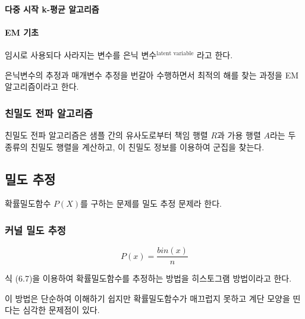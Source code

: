 \documentclass [12pt] {oblivoir}
\let\oldsubsubsection=\subsubsection
\renewcommand{\subsubsection}
{
  \filbreak
  \oldsubsubsection
}
\begin{document}
\vspace{3mm}

\paragraph*{다중 시작 k-평균 알고리즘}\mbox{}

\vspace{3mm}

\paragraph*{EM 기초}\mbox{}

임시로 사용되다 사라지는 변수를 은닉 변수$^{\text{latent variable}}$ 라고 한다.

\vspace{3mm}

은닉변수의 추정과 매개변수 추정을 번갈아 수행하면서 최적의 해를 찾는 과정을 EM 알고리즘이라고 한다.

\vspace{3mm}

\subsubsection{친밀도 전파 알고리즘}

친밀도 전파 알고리즘은 샘플 간의 유사도로부터 책임 행렬 $R$과 가용 행렬 $A$라는 두 종류의 친밀도 행렬을 계산하고, 이 친밀도 정보를 이용하여 군집을 찾는다.

\subsection{밀도 추정}

확률밀도함수 $P(X)$를 구하는 문제를 밀도 추정 문제라 한다.

\subsubsection{커널 밀도 추정}

\begin{equation} \tag{6.7}
  P(x) = \frac{bin(x)}{n}
\end{equation}

식 (6.7)을 이용하여 확률밀도함수를 추정하는 방법을 히스토그램 방법이라고 한다.

이 방법은 단순하여 이해하기 쉽지만 확률밀도함수가 매끄럽지 못하고 계단 모양을 띤다는 심각한 문제점이 있다.

\vspace{3mm}
\end{document}

